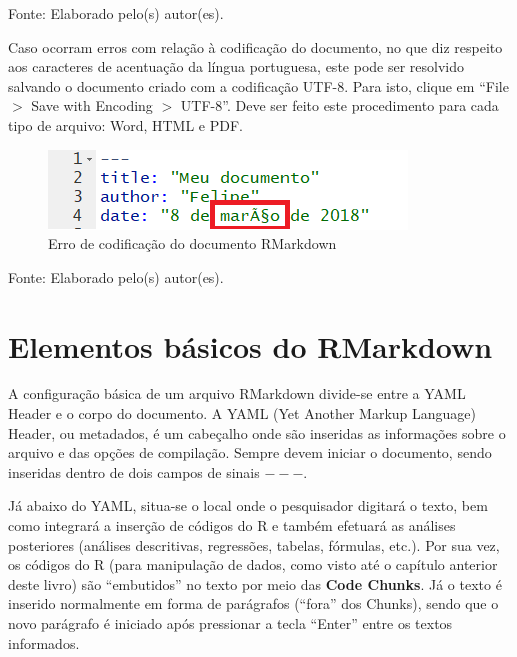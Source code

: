 \documentclass[12pt,brazil,oneside]{book}
\begin{document}
Fonte: Elaborado pelo(s) autor(es).

Caso ocorram erros com relação à codificação do documento, no que diz respeito aos caracteres de acentuação da língua portuguesa, este pode ser resolvido salvando o documento criado com a codificação UTF-8. Para isto, clique em ``File \(>\) Save with Encoding \(>\) UTF-8''. Deve ser feito este procedimento para cada tipo de arquivo: Word, HTML e PDF.

\begin{figure}[H]

{\centering \includegraphics[width=0.7\linewidth]{errocodif} 

}

\caption{Erro de codificação do documento RMarkdown}\label{fig:errocodif}
\end{figure}

Fonte: Elaborado pelo(s) autor(es).

\hypertarget{elementos-basicos-do-rmarkdown}{%
\section{Elementos básicos do RMarkdown}\label{elementos-basicos-do-rmarkdown}}

A configuração básica de um arquivo RMarkdown divide-se entre a YAML Header e o corpo do documento. A YAML (Yet Another Markup Language) Header, ou metadados, é um cabeçalho onde são inseridas as informações sobre o arquivo e das opções de compilação. Sempre devem iniciar o documento, sendo inseridas dentro de dois campos de sinais \(---\).

Já abaixo do YAML, situa-se o local onde o pesquisador digitará o texto, bem como integrará a inserção de códigos do R e também efetuará as análises posteriores (análises descritivas, regressões, tabelas, fórmulas, etc.). Por sua vez, os códigos do R (para manipulação de dados, como visto até o capítulo anterior deste livro) são ``embutidos'' no texto por meio das \textbf{Code Chunks}. Já o texto é inserido normalmente em forma de parágrafos (``fora'' dos Chunks), sendo que o novo parágrafo é iniciado após pressionar a tecla ``Enter'' entre os textos informados.
\end{document}
